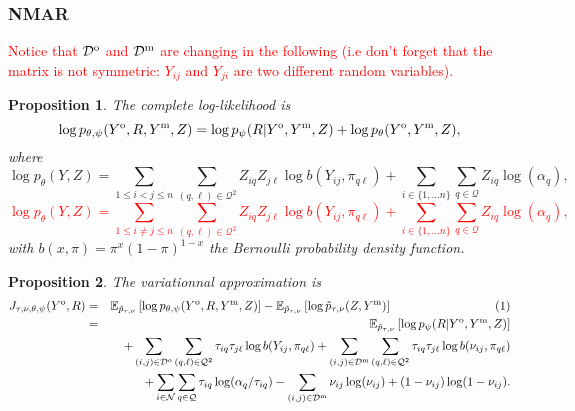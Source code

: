 \documentclass[10pt]{article}
\newcommand{\1}{\mathds{1}}
\newcommand{\MA}{Y}
\newcommand{\MAO}{\MA^\text{\rm o}}
\newcommand{\MAM}{\MA^\text{\rm m}}
\newcommand{\block}{\mathcal{Q}}
\newcommand{\dyad}{\mathcal{D}}
\newcommand{\dyadO}{\dyad^\text{\rm o}}
\newcommand{\dyadM}{\dyad^\text{\rm m}}
\newcommand{\node}{\mathcal{N}}
\newcommand{\Ebb}{\mathbb{E}}
\newtheorem{proposition}{Proposition}
\begin{document}
\subsubsection{NMAR}
\textcolor{red}{Notice that $\dyadO$ and $\dyadM$ are changing in the following (i.e don't forget that the matrix is not symmetric: $\MA_{ij}$
and $\MA_{ji}$ are two different random variables).}
\begin{proposition}      The      complete
  log-likelihood is 
\begin{equation*}
\log  p_{\theta, \psi}(\MAO,R,\MAM,Z)  = \log  p_\psi(R|\MAO,\MAM,Z) +
\log p_\theta(\MAO,\MAM,Z),
 \label{eq:complete_loglik_nmar}
\end{equation*}
where
  \begin{equation}
    \nonumber
    \log  p_{\theta}(\MA,Z)=  \sum_{1 \leq i < j \leq n}  \sum_{(q,\ell)
      \in\block^2}   Z_{iq}Z_{j\ell}\log   b(\MA_{ij},\pi_{q\ell})   +
    \sum_{i\in \{ 1,...n \}}\sum_{q\in\block} Z_{iq}\log (\alpha_{q}),
  \end{equation}
  \textcolor{red}{\begin{equation}
    \nonumber
    \log  p_{\theta}(\MA,Z)=  \sum_{1 \leq i \neq j \leq n}  \sum_{(q,\ell)
      \in\block^2}   Z_{iq}Z_{j\ell}\log   b(\MA_{ij},\pi_{q\ell})   +
    \sum_{i\in \{ 1,...n \}}\sum_{q\in\block} Z_{iq}\log (\alpha_{q}),
  \end{equation}
}
  with $b(x,\pi)=\pi^{x}(1-\pi)^{1-x}$ the Bernoulli probability density function.
\end{proposition}

\begin{proposition} 
The variationnal approximation is
\begin{eqnarray*}
  J_{\tau,\nu,\theta,\psi}(\MAO,R) 
  &=& \Ebb_{\tilde       p_{\tau,\nu}}       \left[\log
      p_{\theta,\psi}(\MAO,R,\MAM,Z)\right]
    -\Ebb_{\tilde p_{\tau,\nu}}\left[ \log \tilde p_{\tau,\nu}(Z,\MAM)\right] \hspace{3cm} (1) \\
  &=& \Ebb_{\tilde p_{\tau,\nu}} \left[\log p_\psi(R | \MAO,\MAM,Z)\right] \\  
  && + \sum_{(i,j)\in\dyadO}\sum_{(q,\ell)\in\block^2}\tau_{iq}\tau_{j\ell}\log
  b(\MA_{ij},\pi_{q\ell})
  +\sum_{(i,j)\in\dyadM}\sum_{(q,\ell)\in\block^2}\tau_{iq}\tau_{j\ell}\log
  b(\nu_{ij},\pi_{q\ell}) \\
  && +  \sum_{i\in\node}\sum_{q\in\block}\tau_{iq} \log (\alpha_{q}/\tau_{iq})
  -\sum_{(i,j)\in \dyadM} \nu_{ij}\log (\nu_{ij}) + (1-\nu_{ij}) \log (1-\nu_{ij}).
  \label{eq:var:approx:nmar}
\end{eqnarray*}
\end{proposition}
\end{document}
